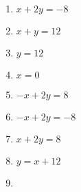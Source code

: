 \documentclass{article}%
\begin{document}
\begin{multicols}{2}%
\begin{enumerate}[label=\arabic*),start=1]%
\item%


$x+2y=-8$

%
\newline%
\newline%
%
\vspace{3cm}%
\item%


$x+y=12$

%
\newline%
\newline%
%
\vspace{3cm}%
\item%


$y=12$

%
\newline%
\newline%
%
\vspace{2.5cm}%
\item%


$x=0$

%
\newline%
\newline%
%
\vspace{2.5cm}%
\item%


$-x+2y=8$

%
\newline%
\newline%
%
\vspace{2.5cm}%
\item%


$-x+2y=-8$

%
\newline%
\newline%
%
\vspace{2.5cm}%
\item%


$x+2y=8$

%
\newline%
\newline%
%
\vspace{2.5cm}%
\item%


$y=x+12$

%
\newline%
\newline%
%
\vspace{2.5cm}%
\item%



\end{enumerate}
\end{multicols}
\end{document}
